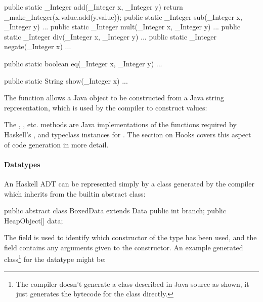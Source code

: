 \documentclass[dissertation.tex]{subfiles}
\begin{document}
{{{{\begin{javafigure}
{                    public static _Integer add(_Integer x, _Integer y) {
                        return _make_Integer(x.value.add(y.value));
                    }
                    public static _Integer sub(_Integer x, _Integer y) { ... }
                    public static _Integer mult(_Integer x, _Integer y) { ... }
                    public static _Integer div(_Integer x, _Integer y) { ... }
                    public static _Integer negate(_Integer x) { ... }

                    public static boolean eq(_Integer x, _Integer y) { ... }

                    public static String show(_Integer x) { ... }
                }
                \end{javafigure}

                The  function allows a Java  object to be constructed from a
                Java string representation, which is used by the compiler to construct  values:


                The , , etc. methods are Java implementations of the functions required by Haskell's
                ,  and  typeclass instances for . The section on
                Hooks covers this aspect of code generation in more detail.

            }
            \paragraph*{Datatypes}
            {
                
                An Haskell ADT can be represented simply by a class generated by the compiler which inherits from the
                 builtin abstract class:

                \begin{javafigure}
                public abstract class BoxedData extends Data {
                    public int branch;
                    public HeapObject[] data;
                }
                \end{javafigure}

                The  field is used to identify which constructor of the type has been used, and the
                 field contains any arguments given to the constructor. An example generated
                class\footnote{The compiler doesn't generate a class described in Java source as shown, it just
                generates the bytecode for the class directly.} for the datatype  might be:

}}}}
\end{document}
